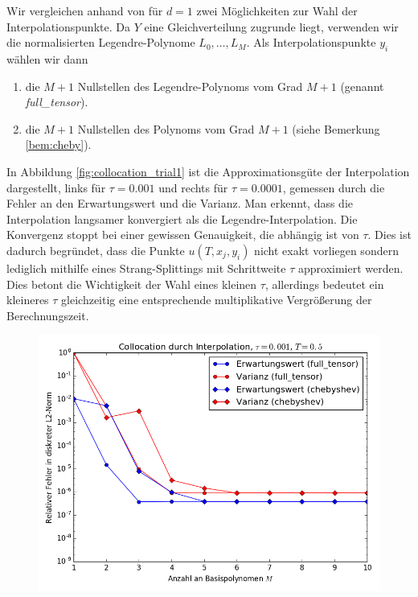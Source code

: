 \begin{mathbsp}
Wir vergleichen anhand von  für $d=1$ zwei Möglichkeiten zur Wahl der Interpolationspunkte. Da $Y$ eine Gleichverteilung zugrunde liegt, verwenden wir die normalisierten Legendre-Polynome $L_0,\dots,L_M$. Als Interpolationspunkte $y_i$ wählen wir dann
\begin{enumerate}
\item die $M+1$ Nullstellen des Legendre-Polynoms vom Grad $M+1$ (genannt \textit{full\_tensor}).
\item die $M+1$ Nullstellen des \chebyspace Polynoms vom Grad $M+1$ (siehe Bemerkung \ref{bem:cheby}).
\end{enumerate}
In Abbildung \ref{fig:collocation_trial1} ist die Approximationsgüte der Interpolation dargestellt, links für $\tau=0.001$ und rechts für $\tau=0.0001$, gemessen durch die Fehler an den Erwartungswert und die Varianz. Man erkennt, dass die \chebyspace Interpolation langsamer konvergiert als die Legendre-Interpolation. Die Konvergenz stoppt bei einer gewissen Genauigkeit, die abhängig ist von $\tau$. Dies ist dadurch begründet, dass die Punkte $u(T,x_j,y_i)$ nicht exakt vorliegen sondern lediglich mithilfe eines Strang-Splittings mit Schrittweite $\tau$ approximiert werden. Dies betont die Wichtigkeit der Wahl eines kleinen $\tau$, allerdings bedeutet ein kleineres $\tau$ gleichzeitig eine entsprechende multiplikative Vergrößerung der Berechnungszeit.
\begin{figure}[!htb]
  \includegraphics[width=\linewidth]{Figures/collocation_mi_trial1_tau001.png}
\endminipage
{}

\end{figure}
\end{mathbsp}
